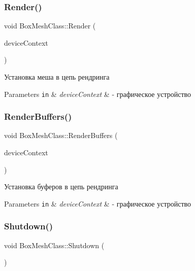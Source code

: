 \subsubsection{\texorpdfstring{Render()}{Render()}}
{\footnotesize\ttfamily void Box\+Mesh\+Class\+::\+Render (\begin{DoxyParamCaption}\item[{I\+D3\+D11\+Device\+Context $\ast$}]{device\+Context }\end{DoxyParamCaption})}



Установка меша в цепь рендринга 


\begin{DoxyParams}[1]{Parameters}
\mbox{\tt in}  & {\em device\+Context} & -\/ графическое устройство \\
\hline
\end{DoxyParams}
\mbox{\label{group___meshes_gac70d8b4689d1666f547585fc60c8a21c}} 
\subsubsection{\texorpdfstring{Render\+Buffers()}{RenderBuffers()}}
{\footnotesize\ttfamily void Box\+Mesh\+Class\+::\+Render\+Buffers (\begin{DoxyParamCaption}\item[{I\+D3\+D11\+Device\+Context $\ast$}]{device\+Context }\end{DoxyParamCaption})\hspace{0.3cm}{\ttfamily [private]}}



Установка буферов в цепь рендринга 


\begin{DoxyParams}[1]{Parameters}
\mbox{\tt in}  & {\em device\+Context} & -\/ графическое устройство \\
\hline
\end{DoxyParams}
\mbox{\label{group___meshes_ga93bf13a26ba0fce8444d818e89c04508}} 
\subsubsection{\texorpdfstring{Shutdown()}{Shutdown()}}
{\footnotesize\ttfamily void Box\+Mesh\+Class\+::\+Shutdown (\begin{DoxyParamCaption}{ }\end{DoxyParamCaption})}

